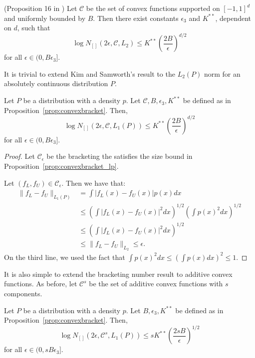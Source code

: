 \begin{proposition} (Proposition 16 in \cite{kim2014global})
\label{prop:convexbracket}
Let $\mathcal{C}$ be the set of convex functions supported on $[-1, 1]^d$ and uniformly bounded by $B$. Then there exist constants $\epsilon_3$ and $K^{**}$, dependent on $d$, such that
\[
\log N_{[]} (2\epsilon, \mathcal{C}, L_2) \leq K^{**} \left( \frac{2B}{\epsilon} \right)^{d/2}
\]
for all $\epsilon \in (0, B \epsilon_3]$.
\end{proposition}

It is trivial to extend Kim and Samworth's result to the $L_2(P)$ norm for an absolutely continuous distribution $P$.

\begin{proposition}
\label{prop:convexbracket_lp}
Let $P$ be a distribution with a density $p$. Let $\mathcal{C}, B, \epsilon_3, K^{**}$ be defined as in Proposition~\ref{prop:convexbracket}. Then,
\[
\log N_{[]} (2\epsilon, \mathcal{C}, L_1(P)) \leq K^{**} \left( \frac{2B}{\epsilon} \right)^{d/2}
\]
for all $\epsilon \in (0, B\epsilon_3]$.
\end{proposition}

\begin{proof}
Let $\mathcal{C}_\epsilon$ be the bracketing the satisfies the size bound in Proposition~\ref{prop:convexbracket_lp}. 

Let $(f_L, f_U) \in \mathcal{C}_\epsilon$. Then we have that:
\begin{align*}
\| f_L - f_U \|_{L_1(P)} &= \int | f_L(x) - f_U(x)| p(x) dx \\
   &\leq \left( \int | f_L(x) - f_U(x) |^2 dx \right)^{1/2}
      \left( \int p(x)^2 dx \right)^{1/2} \\
  &\leq \left( \int | f_L(x) - f_U(x)|^2 dx \right)^{1/2}\\
 &\leq \| f_L - f_U \|_{L_2} \leq \epsilon.
\end{align*}
On the third line, we used the fact that $\int p(x)^2 dx \leq \left( \int p(x) dx \right)^2 \leq 1$.
\end{proof}

It is also simple to extend the bracketing number result to additive convex functions. As before, let $\mathcal{C}^s$ be the set of additive convex functions with $s$ components.

\begin{corollary}
\label{cor:convexadditive_lp}
Let $P$ be a distribution with a density $p$. Let $B, \epsilon_3, K^{**}$ be defined as in Proposition~\ref{prop:convexbracket}. Then,
\[
\log N_{[]}(2\epsilon, \mathcal{C}^s, L_1(P)) \leq s K^{**} 
    \left( \frac{2sB}{\epsilon} \right)^{1/2}
\]
for all $\epsilon \in (0, s B \epsilon_3]$.
\end{corollary}

